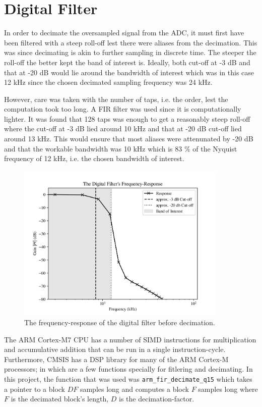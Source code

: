 \documentclass[notitlepage]{report}
\begin{document}
\section{Digital Filter} \label{Digital_Filter}

In order to decimate the oversampled signal from the ADC, it must first have been filtered with a steep roll-off lest there were aliases from the decimation. This was since decimating is akin to further sampling in discrete time. The steeper the roll-off the better kept the band of interest is. Ideally, both cut-off at -3 \si{dB} and that at -20 \si{dB} would lie around the bandwidth of interest which was in this case 12 \si{kHz} since the chosen decimated sampling frequency was 24 \si{kHz}.

However, care was taken with the number of taps, i.e. the order, lest the computation took too long. A FIR filter was used since it is computationally lighter. It was found that 128 taps was enough to get a reasonably steep roll-off where the cut-off at -3 \si{dB} lied around 10 \si{kHz} and that at -20 \si{dB} cut-off lied around 13 \si{kHz}. This would ensure that most aliases were attenunated by -20 \si{dB} and that the workable bandwidth was 10 \si{kHz} which is 83 \% of the Nyquist frequency of 12 \si{kHz}, i.e. the chosen bandwidth of interest.

\begin{figure}[H]
\includegraphics[width=0.9\textwidth]{../Python/filter/frequency.png}
\centering
\caption{The frequency-response of the digital filter before decimation.}
\label{fig:filter_frequency}
\centering
\end{figure}

The ARM Cortex-M7 CPU has a number of SIMD instructions for multiplication and accumulative addition that can be run in a single instruction-cycle\cite{noauthor_digital_2018}. Furthermore, CMSIS has a DSP library for many of the ARM Cortex-M processors; in which are a few functions specially for fitlering and decimating. In this project, the function that was used was \texttt{arm\_fir\_decimate\_q15} which takes a pointer to a block $DF$ samples long and computes a block $F$ samples long where $F$ is the decimated block's length, $D$ is the decimation-factor.
\end{document}
